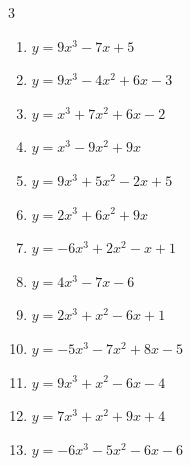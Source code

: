 \begin{multicols}{3}
\begin{enumerate}
  \item $y=9x^{3}-7x+5$


  \item $y=9x^{3}-4x^{2}+6x-3$


  \item $y=x^{3}+7x^{2}+6x-2$


  \item $y=x^{3}-9x^{2}+9x$


  \item $y=9x^{3}+5x^{2}-2x+5$


  \item $y=2x^{3}+6x^{2}+9x$


  \item $y=-6x^{3}+2x^{2}-x+1$


  \item $y=4x^{3}-7x-6$


  \item $y=2x^{3}+x^{2}-6x+1$


  \item $y=-5x^{3}-7x^{2}+8x-5$


  \item $y=9x^{3}+x^{2}-6x-4$


  \item $y=7x^{3}+x^{2}+9x+4$


  \item $y=-6x^{3}-5x^{2}-6x-6$


\end{enumerate}
\end{multicols}

